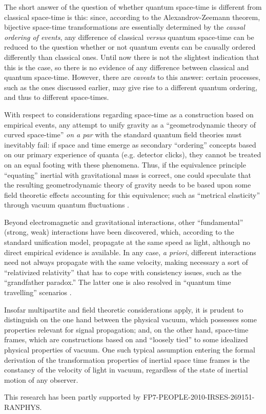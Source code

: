 \documentclass[%
  preprint,
 showpacs,
 showkeys,
 preprintnumbers,
 amsmath,amssymb,
 aps,
  pra,
  longbibliography,
 ]{revtex4-1}
\begin{document}
The short answer of the question of whether quantum space-time is different from classical space-time is this:
since, according to the Alexandrov-Zeemann theorem, bijective space-time transformations are essentially
determined by the {\em causal ordering of events}, any difference of classical {\it versus} quantum space-time
can be reduced to the question whether or not quantum events can be causally ordered differently than classical ones.
Until now there is not the slightest indication that this is the case,
so there is no evidence of any difference between classical and quantum space-time.
However, there are {\it caveats} to this answer: certain processes,
such as the ones discussed earlier, may give rise to a different quantum ordering,
and thus to different space-times.


With respect to considerations regarding space-time as a construction based on empirical events,
any attempt to unify gravity  as a ``geometrodynamic theory of curved space-time''  {\it on a par} with the standard quantum field theories
must inevitably fail:
if space and time emerge as secondary ``ordering''
concepts based on our primary experience of quanta (e.g. detector clicks),
they cannot be treated on an equal footing with these phenomena.
Thus, if the equivalence principle ``equating'' inertial with gravitational mass is correct,
one could speculate that
the resulting geometrodynamic theory of gravity needs to be based upon some field theoretic effects accounting for this equivalence;
such as ``metrical elasticity'' through vacuum quantum fluctuations \cite{Sakharov-67}.


Beyond electromagnetic and gravitational interactions,
other ``fundamental'' (strong, weak) interactions have been discovered, which, according to the standard unification model,
propagate at the same speed as light, although no direct empirical evidence is available.
In any case, {\it a priori}, different interactions need not always propagate with the same velocity,
making necessary a sort of ``relativized relativity'' \cite{svozil-relrel} that has to cope with
consistency issues, such as the ``grandfather paradox.''
The latter one is also resolved in ``quantum time travelling'' scenarios \cite{svozil-greenberger-2005}.

Insofar multipartite and field theoretic considerations apply, it is prudent to distinguish on the one hand between the
physical vacuum, which possesses some properties relevant for signal propagation;
and, on the other hand, space-time frames, which are constructions based on and ``loosely tied'' to some idealized physical properties of vacuum.
One such typical assumption entering the formal derivation of the transformation properties of inertial space time frames
is the constancy of the velocity of light in vacuum, regardless of the state of inertial motion of any observer.




\begin{acknowledgments}
This research has been partly supported by FP7-PEOPLE-2010-IRSES-269151-RANPHYS.
\end{acknowledgments}

 
\end{document}
